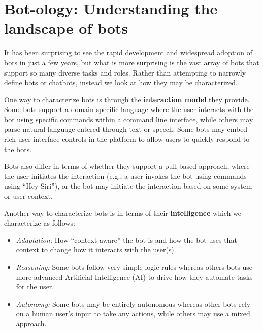 \documentclass{sig-alternate}
\newcommand{\cl}[1]{\textcolor{blue}{{\it [Carly says: #1]}}}
\begin{document}
\section{Bot-ology: Understanding the landscape of bots}


It has been surprising to see the rapid development and widespread adoption of bots in just a few years, but what is more surprising is the vast array of bots that support so many diverse tasks and roles.  
Rather than attempting to narrowly define bots or chatbots, instead we look at how they may be characterized. 

One way to characterize bots is through the \textbf{interaction model} they provide. 
Some bots support a domain specific language where the user interacts with the bot using specific commands within a command line interface, while others may parse natural language entered through text or speech.  
Some bots may embed rich user interface controls in the platform to allow users to quickly respond to the bots.

Bots also differ in terms of whether they support a pull based approach, where the user initiates the interaction (e.g., a user invokes the bot using commands using ``Hey Siri''), or the bot may initiate the interaction based on some system or user context. 

Another way to characterize bots is in terms of their \textbf{intelligence} which we characterize as follows:
\begin{itemize}
\item \emph{Adaptation:} How ``context aware'' the bot is and how the bot uses that context to change how it interacts with the user(s). 
\item \emph{Reasoning:} Some bots follow very simple logic rules
whereas others bots use more advanced Artificial Intelligence (AI) to drive how they automate tasks for the user.  
\item \emph{Autonomy:}  Some bots may be entirely autonomous whereas other bots rely on a human user's input to take any actions, while others may use a mixed approach.  
\end{itemize}
\end{document}
